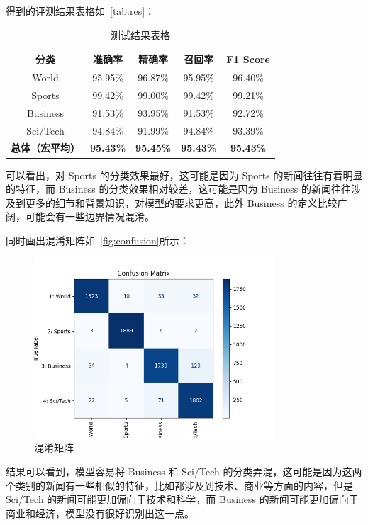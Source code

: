 得到的评测结果表格如~\autoref{tab:res}：

\begin{table}[htbp]
    \centering
    \begin{tabular}{ccccc}
        \toprule
        分类 & 准确率 & 精确率 & 召回率 & F1 Score \\
        \midrule
        World & 95.95\% & 96.87\% & 95.95\% & 96.40\% \\
        Sports & 99.42\% & 99.00\% & 99.42\% & 99.21\% \\
        Business & 91.53\% & 93.95\% & 91.53\% & 92.72\% \\
        Sci/Tech & 94.84\% & 91.99\% & 94.84\% & 93.39\% \\
        \textbf{总体（宏平均）} & \textbf{95.43\%} & \textbf{95.45\%} & \textbf{95.43\%} & \textbf{95.43\%} \\
        \bottomrule
    \end{tabular}
    \caption{测试结果表格}
    \label{tab:res}
\end{table}

可以看出，对 Sports 的分类效果最好，这可能是因为 Sports 的新闻往往有着明显的特征，而 Business 的分类效果相对较差，这可能是因为 Business 的新闻往往涉及到更多的细节和背景知识，对模型的要求更高，此外 Business 的定义比较广阔，可能会有一些边界情况混淆。

同时画出混淆矩阵如~\autoref{fig:confusion}所示：\begin{figure}[htbp]
    \centering
    \includegraphics[width=0.8\textwidth]{images/matrix.png}
    \caption{混淆矩阵}
    \label{fig:confusion}
\end{figure}

结果可以看到，模型容易将 Business 和 Sci/Tech 的分类弄混，这可能是因为这两个类别的新闻有一些相似的特征，比如都涉及到技术、商业等方面的内容，但是 Sci/Tech 的新闻可能更加偏向于技术和科学，而 Business 的新闻可能更加偏向于商业和经济，模型没有很好识别出这一点。

